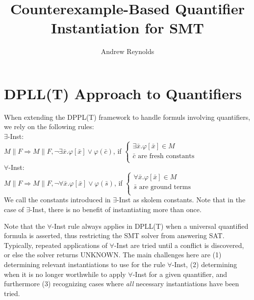 \documentclass{llncs}
\begin{document}
\pagestyle{plain}

\title{Counterexample-Based Quantifier Instantiation for SMT}

\author{Andrew Reynolds}

\date{}

\maketitle
\thispagestyle{empty}

\section{DPLL(T) Approach to Quantifiers}

When extending the DPPL(T) framework to handle formuls involving quantifiers, we rely on the following rules: \\

\noindent $\exists$-Inst: \\

$M \parallel F \Longrightarrow M \parallel F, \neg \exists \bar{x}. \varphi[ \bar{ x } ] \vee \varphi( \bar{ c } )$, if   
$\begin{cases}
  \exists \bar{x}. \varphi[ \bar{ x } ] \in M \\
  \bar{ c } \text{ are fresh constants} \\
\end{cases}$ \\

\noindent $\forall$-Inst: \\

$M \parallel F \Longrightarrow M \parallel F, \neg \forall \bar{x}. \varphi[ \bar{ x } ] \vee \varphi( \bar{ s } )$, if   
$\begin{cases}
  \forall \bar{x}. \varphi[ \bar{ x } ] \in M \\
  \bar{ s } \text{ are ground terms} \\
\end{cases}$ \\

We call the constants introduced in $\exists$-Inst as skolem constants.
Note that in the case of $\exists$-Inst, there is no benefit of instantiating more than once.

Note that the $\forall$-Inst rule always applies in DPLL(T) when a universal quantified formula is asserted, thus restricting the SMT solver from answering SAT.
Typically, repeated applications of $\forall$-Inst are tried until a conflict is discovered, or else the solver returns UNKNOWN.
The main challenges here are (1) determining relevant instantiations to use for the rule $\forall$-Inst, (2) determining when it is no longer worthwhile to apply $\forall$-Inst for a given quantifier, and furthermore (3) recognizing cases where \emph{all} necessary instantiations have been tried.
\end{document}
